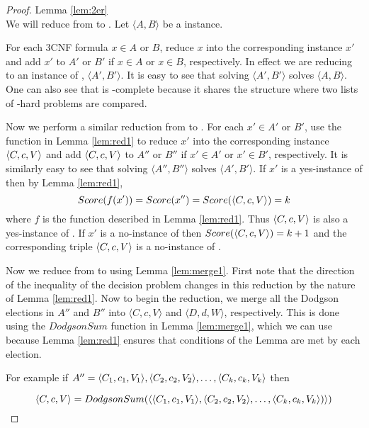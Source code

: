\begin{proof}{Lemma \ref{lem:2er}}\\
    We will reduce from \csat to .
    Let $\langle A,B \rangle$ be a \csat instance.

    For each 3CNF formula $x \in A$ or $B$, reduce $x$ into
    the corresponding  instance $x'$ and add $x'$
    to $A'$ or $B'$ if $x\in A$ or $x \in B$, respectively.
    In effect we are reducing \csat to an instance of
    , $\langle A', B' \rangle$.
    It is easy to see that solving $\langle A', B' \rangle$
    solves $\langle A, B \rangle$.
    One can also see that  is \tp-complete
    because it shares the structure where two lists of \np-hard
    problems are compared.

    Now we perform a similar reduction from 
    to .
    For each $x' \in A'$ or $B'$, use the function in
    Lemma \ref{lem:red1} to reduce $x'$ into the corresponding
    \dscore instance $\langle C,c,V \rangle$ and add $\langle C,c,V \rangle$
    to $A''$ or $B''$ if $x'\in A'$ or $x' \in B'$, respectively.
    It is similarly easy to see that solving $\langle A'', B'' \rangle$
    solves $\langle A', B' \rangle$.
    If $x'$ is a yes-instance of  then by
    Lemma \ref{lem:red1},
    \[Score(f(x')) = Score(x'') = Score(\langle C,c,V \rangle) = k\]
    where $f$ is the function described in Lemma \ref{lem:red1}.
    Thus $\langle C,c,V \rangle$ is also
    a yes-instance of \dscore.
    If $x'$ is a no-instance of  then
    $Score(\langle C,c,V \rangle) = k+1$ and the corresponding triple
    $\langle C,c,V \rangle$ is a no-instance of \dscore.

    Now we reduce from  to 
    using Lemma \ref{lem:merge1}.
    First note that the direction of the inequality of the decision problem
    changes in this reduction by the nature of Lemma \ref{lem:red1}.
    Now to begin the reduction, we merge all the Dodgson elections
    in $A''$ and $B''$ into $\langle C,c,V \rangle$ and $\langle D,d,W \rangle$,
    respectively.
    This is done using the $DodgsonSum$ function in Lemma \ref{lem:merge1},
    which we can use because Lemma \ref{lem:red1} ensures that conditions of
    the Lemma are met by each election.

    For example if $A'' = \langle C_{1},c_{1},V_{1} \rangle,\langle C_{2},c_{2},V_{2} \rangle, \dots, \langle C_{k},c_{k},V_{k} \rangle$
    then

    \[\langle C,c,V \rangle = DodgsonSum(\langle \langle C_{1},c_{1},V_{1} \rangle,\langle C_{2},c_{2},V_{2} \rangle, \dots,
    \langle C_{k},c_{k},V_{k} \rangle) \rangle)\]


\end{proof}
